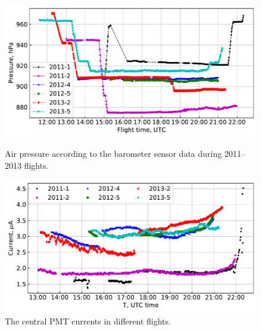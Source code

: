 \documentclass[universe,article,submit,moreauthors,pdftex]{Definitions/mdpi}
\begin{document}
\begin{figure}[tb]    
    \begin{minipage}[t]{0.48\textwidth}
        \centering
        \includegraphics[width=\textwidth]{Telemetry_pressure.pdf}
        \caption{Air pressure according to the barometer sensor data during 2011--2013 flights.}
        \label{fig:pressure}
    \end{minipage}
    \hfill
    \begin{minipage}[t]{0.48\textwidth}
        \centering
        \includegraphics[width=\textwidth]{hv-53.pdf}
        \caption{The central PMT currents in different flights.}
        \label{fig:current}
    \end{minipage}
\end{figure}
\end{document}
